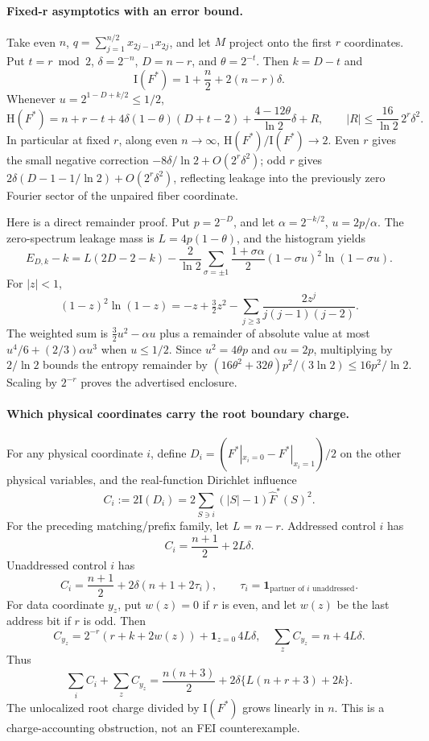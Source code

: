 \documentclass[11pt]{article}
\newcommand{\I}{\mathrm I}
\newcommand{\Ent}{\mathrm H}
\begin{document}
\paragraph{Fixed-r asymptotics with an error bound.}
Take even $n$, $q=\sum_{j=1}^{n/2}x_{2j-1}x_{2j}$, and let $M$ project
onto the first $r$ coordinates. Put $t=r\bmod2$, $\delta=2^{-n}$,
$D=n-r$, and $\theta=2^{-t}$. Then $k=D-t$ and
\[
 \I(F^*)=1+\frac n2+2(n-r)\delta.
\]
Whenever $u=2^{1-D+k/2}\le1/2$,
\[
 \Ent(F^*)=n+r-t+4\delta(1-\theta)(D+t-2)
              +\frac{4-12\theta}{\ln2}\delta+R,
 \qquad |R|\le\frac{16}{\ln2}\,2^r\delta^2.
\]
In particular at fixed $r$, along even $n\to\infty$,
$\Ent(F^*)/\I(F^*)\to2$. Even $r$ gives the small negative correction
$-8\delta/\ln2+O(2^r\delta^2)$; odd $r$ gives
$2\delta(D-1-1/\ln2)+O(2^r\delta^2)$, reflecting leakage into the
previously zero Fourier sector of the unpaired fiber coordinate.

Here is a direct remainder proof. Put $p=2^{-D}$, and let
$\alpha=2^{-k/2}$, $u=2p/\alpha$. The zero-spectrum leakage mass is
$L=4p(1-\theta)$, and the histogram yields
\[
 E_{D,k}-k=L(2D-2-k)-\frac2{\ln2}
 \sum_{\sigma=\pm1}\frac{1+\sigma\alpha}{2}
 (1-\sigma u)^2\ln(1-\sigma u).
\]
For $|z|<1$,
\[
 (1-z)^2\ln(1-z)=-z+\tfrac32z^2
 -\sum_{j\ge3}\frac{2z^j}{j(j-1)(j-2)}.
\]
The weighted sum is $\frac32u^2-\alpha u$ plus a remainder of
absolute value at most $u^4/6+(2/3)\alpha u^3$ when $u\le1/2$.
Since $u^2=4\theta p$ and $\alpha u=2p$, multiplying by $2/\ln2$
bounds the entropy remainder by
$(16\theta^2+32\theta)p^2/(3\ln2)\le16p^2/\ln2$.
Scaling by $2^{-r}$ proves the advertised enclosure.

\paragraph{Which physical coordinates carry the root boundary charge.}
For any physical coordinate $i$, define
$D_i=(F^*|_{x_i=0}-F^*|_{x_i=1})/2$ on the other physical variables,
and the real-function Dirichlet influence
\[
 C_i:=2\I(D_i)=2\sum_{S\ni i}(|S|-1)\widehat F^*(S)^2.
\]
For the preceding matching/prefix family, let $L=n-r$. Addressed
control $i$ has
\[
 C_i=\frac{n+1}{2}+2L\delta.
\]
Unaddressed control $i$ has
\[
 C_i=\frac{n+1}{2}+2\delta(n+1+2\tau_i),
 \qquad \tau_i=\mathbf1_{\text{partner of }i\text{ unaddressed}}.
\]
For data coordinate $y_z$, put $w(z)=0$ if $r$ is even, and let
$w(z)$ be the last address bit if $r$ is odd. Then
\[
 C_{y_z}=2^{-r}(r+k+2w(z))+\mathbf1_{z=0}\,4L\delta,
 \quad \sum_zC_{y_z}=n+4L\delta.
\]
Thus
\[
 \sum_i C_i+\sum_zC_{y_z}
 =\frac{n(n+3)}2+2\delta\{L(n+r+3)+2k\}.
\]
The unlocalized root charge divided by $\I(F^*)$ grows linearly
in $n$. This is a charge-accounting obstruction, not an FEI counterexample.
\end{document}
